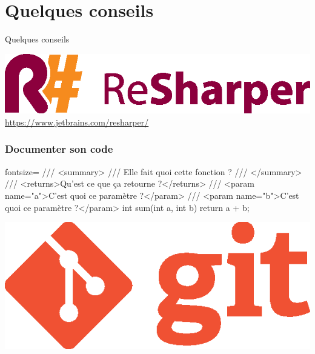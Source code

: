 \section{Quelques conseils}

\begingroup
\begin{frame}
    \begin{center}
        \vspace{1cm}
        {\Large\color{foreground}
            Quelques conseils
        }
    \end{center}
\end{frame}
\endgroup

\begin{frame}[c]
\begin{center}
  \includegraphics[scale=0.7]{img/logo_resharper.eps}\\

  {\large \url{https://www.jetbrains.com/resharper/}}
\end{center}
\end{frame}

\begin{frame}[fragile]
  \frametitle{Documenter son code}

  \begin{csharpcode*}{fontsize=\scriptsize}
    /// <summary>
    /// Elle fait quoi cette fonction ?
    /// </summary>
    /// <returns>Qu'est ce que ça retourne ?</returns>
    /// <param name="a">C'est quoi ce paramètre ?</param>
    /// <param name="b">C'est quoi ce paramètre ?</param>
    int sum(int a, int b)
    {
      return a + b;
    }
  \end{csharpcode*}
\end{frame}

\begin{frame}[c]
  \begin{center}
    \vspace{1cm}
    \includegraphics[scale=1]{img/logo_git.eps}
  \end{center}
\end{frame}

